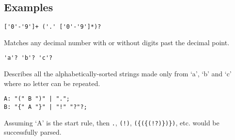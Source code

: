 
\subsection{Examples}
{
	\begin{itemize}
	{
		\item[] \lstinline[language=MAIA, columns=fixed]@['0'-'9']+ ('.' ['0'-'9']*)?@
		
			Matches any decimal number with or without digits
			past the decimal point.
		
		\item[] \lstinline[language=MAIA, columns=fixed]@'a'? 'b'? 'c'?@
		
			Describes all the alphabetically-sorted strings made only
			from `a', `b' and `c' where no letter can be repeated.
		
		\item[]
\begin{lstlisting}[texcl = true, language = MAIA]
A: "(" B ")" | ".";
B: "{" A "}" | "!" "?"?;
\end{lstlisting}
			Assuming `A' is the start rule, then \texttt{.},
			\texttt{(!)}, \texttt{(\{(\{(!?)\})\})}, etc.
			would be successfully parsed.
	}
	\end{itemize}
}
